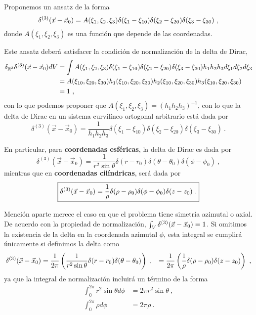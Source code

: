 \begin{demo}
    Proponemos un ansatz de la forma
    \begin{equation*}
        \delta^{(3)} (\vec{x}-\vec{x}_0) = A(\xi_1, \xi_2, \xi_3) \delta(\xi_1 - \xi_{10}) \delta(\xi_2 - \xi_{20}) \delta(\xi_3 - \xi_{30}) \ ,
    \end{equation*}
    donde $A(\xi_1, \xi_2, \xi_3)$ es una función que depende de las coordenadas.

    Este ansatz deberá satisfacer la condición de normalización de la delta de Dirac, 
    \begin{align*}
        \delta_{\mathbb{R}^3} \delta^{(3)} (\vec{x} - \vec{x}_0) dV & = \int A(\xi_1, \xi_2, \xi_3) \delta(\xi_1 - \xi_{10}) \delta(\xi_2 - \xi_{20}) \delta(\xi_3 - \xi_{30}) h_1 h_2 h_3 d\xi_1 d\xi_2 d\xi_3 \\ 
        & = A(\xi_{10}, \xi_{20}, \xi_{30}) h_1(\xi_{10}, \xi_{20}, \xi_{30}) h_2(\xi_{10}, \xi_{20}, \xi_{30}) h_3(\xi_{10}, \xi_{20}, \xi_{30}) \\
        & = 1 \ ,
    \end{align*}
    con lo que podemos proponer que $A(\xi_1, \xi_2, \xi_3) = (h_1 h_2 h_3)^{-1}$, con lo que la delta de Dirac en un sistema curvilíneo ortogonal arbitrario está dada por
    \begin{equation*}
        \delta^{(3)}(\vec{x}-\vec{x}_0) = \frac{1}{h_1 h_2 h_3} \delta(\xi_1 - \xi_{10}) \delta(\xi_2 - \xi_{20}) \delta(\xi_3 - \xi_{30}) \ .
    \end{equation*}
\end{demo}

En particular, para \textbf{coordenadas esféricas}, la delta de Dirac es dada por
\begin{equation}
    \boxed{\delta^{(3)}(\vec{x} - \vec{x}_0) = \frac{1}{r^2 \sin\theta} \delta(r-r_0) \delta(\theta-\theta_0) \delta(\phi - \phi_0) \ ,}
\end{equation}
mientras que en \textbf{coordenadas cilíndricas}, será dada por
\begin{equation}
    \boxed{\delta^{(3)}(\x - \x_0) = \frac{1}{\rho} \delta(\rho - \rho_0) \delta(\phi-\phi_0) \delta(z-z_0) \ .}
\end{equation}

Mención aparte merece el caso en que el problema tiene simetría azimutal o axial. De acuerdo con la propiedad de normalización, $\int_V \delta^{(3)}(\vec{x}-\vec{x}_0) = 1$. Si omitimos la existencia de la delta en la coordenada azimutal $\phi$, esta integral se cumplirá únicamente si definimos la delta como
\begin{align*}
    \delta^{(3)}(\x - \x_0) & = \frac{1}{2\pi} \left( \frac{1}{r^2\sin\theta} \delta(r-r_0) \delta(\theta-\theta_0) \right) \ ,
    & = \frac{1}{2\pi} \left( \frac{1}{\rho} \delta(\rho - \rho_0) \delta(z-z_0) \right) \ ,
\end{align*}
ya que la integral de normalización incluirá un término de la forma
\begin{align*}
    \int_0^{2\pi} r^2 \sin \theta d\phi & = 2\pi r^2 \sin \theta \ , \\
    \int_0^{2\pi} \rho d\phi & = 2\pi \rho \ .
\end{align*}

